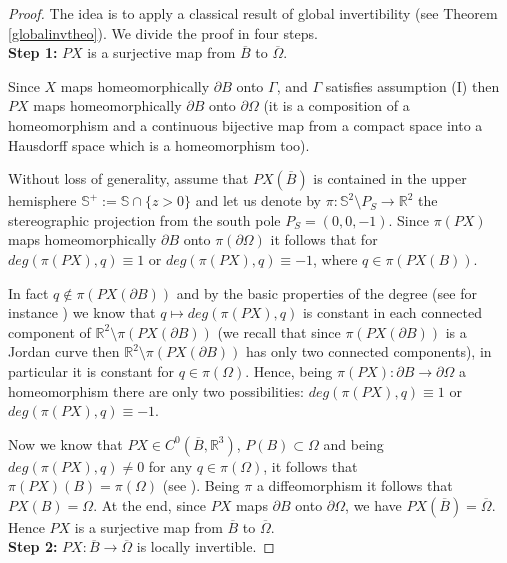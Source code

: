 \documentclass[a4paper,reqno,10pt,oneside]{amsart}
\numberwithin{equation}{section}
\begin{document}
\begin{proof}
The idea is to apply a classical result of global invertibility (see Theorem \ref{globalinvtheo}). We divide the proof in four steps.\\

\textbf{Step 1:}  $PX$ is a surjective map from $\overline B$ to $\overline \Omega$.

Since $X$ maps homeomorphically $\partial B$ onto $\Gamma$, and $\Gamma$ satisfies assumption (I) then $PX$ maps homeomorphically $\partial B$ onto $\partial \Omega$ (it is a composition of a homeomorphism and a continuous  bijective map from a compact space into a Hausdorff space which is a homeomorphism too). 

 Without loss of generality, assume that $PX(\overline B)$ is contained in the upper hemisphere $\mathbb{S}^+:=\mathbb{S} \cap \{z>0\}$ and let us denote by $\pi\colon\mathbb{S}^2\setminus P_S \to {\mathbb R}^2$ the stereographic projection from the south pole $P_S=(0,0,-1)$. Since $\pi(PX)$ maps homeomorphically $\partial B$ onto $\pi(\partial \Omega)$ it follows that for $deg(\pi(PX),q)\equiv 1$ or $deg(\pi(PX),q)\equiv -1$, where $q \in \pi(PX(B))$. 
 
 In fact $q \not\in \pi( PX(\partial B))$ and by the basic properties of the degree (see for instance \cite{FonsecaGangbo}) we know that $q \mapsto deg(\pi(PX),q)$ is constant in each connected component of ${\mathbb R}^2\setminus \pi(PX(\partial B))$ (we recall that since $ \pi(PX(\partial B))$ is a Jordan curve then ${\mathbb R}^2\setminus \pi(PX(\partial B))$ has only two connected components), in particular it is constant for $q \in \pi(\Omega)$. Hence, being $\pi(PX)\colon\partial B \to \partial \Omega$ a homeomorphism there are only two possibilities: $deg(\pi(PX),q)\equiv 1$ or $deg(\pi(PX),q)\equiv -1$.
 
 Now we know that $PX \in C^0(\overline{B},{\mathbb R}^3)$, $P(B) \subset \Omega$ and being  $deg(\pi(PX),q)\neq 0$ for any  $q \in \pi(\Omega)$, it follows that $\pi(PX)(B)=\pi(\Omega)$ (see  \cite{FonsecaGangbo}). Being $\pi$ a diffeomorphism it follows that $PX(B)=\Omega$. At the end, since $PX$ maps $\partial B$ onto $\partial \Omega$, we have $PX(\overline B)=\overline \Omega$. Hence $PX$ is a surjective map from $\overline B$ to $\overline \Omega$.\\

\textbf{Step 2:}  $PX\colon\overline B \to \overline \Omega$ is locally invertible.


\end{proof}
\end{document}
